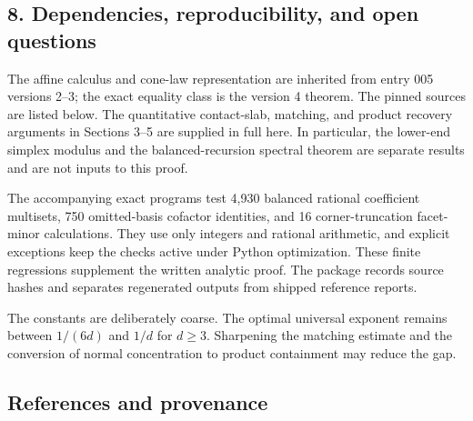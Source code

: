 \documentclass[
  11pt,
]{article}
\begin{document}
\subsection{8. Dependencies, reproducibility, and open
questions}\label{dependencies-reproducibility-and-open-questions}

The affine calculus and cone-law representation are inherited from entry
005 versions 2--3; the exact equality class is the version 4 theorem.
The pinned sources are listed below. The quantitative contact-slab,
matching, and product recovery arguments in Sections 3--5 are supplied
in full here. In particular, the lower-end simplex modulus and the
balanced-recursion spectral theorem are separate results and are not
inputs to this proof.

The accompanying exact programs test 4,930 balanced rational coefficient
multisets, 750 omitted-basis cofactor identities, and 16
corner-truncation facet-minor calculations. They use only integers and
rational arithmetic, and explicit exceptions keep the checks active
under Python optimization. These finite regressions supplement the
written analytic proof. The package records source hashes and separates
regenerated outputs from shipped reference reports.

The constants are deliberately coarse. The optimal universal exponent
remains between \(1/(6d)\) and \(1/d\) for \(d\ge3\). Sharpening the
matching estimate and the conversion of normal concentration to product
containment may reduce the gap.

\subsection{References and provenance}\label{references-and-provenance}
\end{document}
